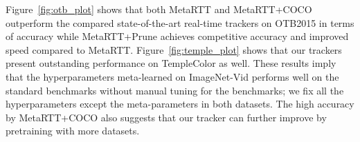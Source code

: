 \documentclass[letterpaper]{article} %
\begin{document}
Figure~\ref{fig:otb_plot} shows that both \textrm{MetaRTT} and \textrm{MetaRTT+COCO} outperform the compared state-of-the-art real-time trackers on OTB2015 in terms of accuracy while MetaRTT+Prune achieves competitive accuracy and improved speed compared to MetaRTT.
Figure~\ref{fig:temple_plot} shows that our trackers present outstanding performance on TempleColor as well. 
These results imply that the hyperparameters meta-learned on ImageNet-Vid performs well on the standard benchmarks without manual tuning for the benchmarks; we fix all the hyperparameters except the meta-parameters in both datasets.
The high accuracy by MetaRTT+COCO also suggests that our tracker can further improve by pretraining with more datasets.
\end{document}
